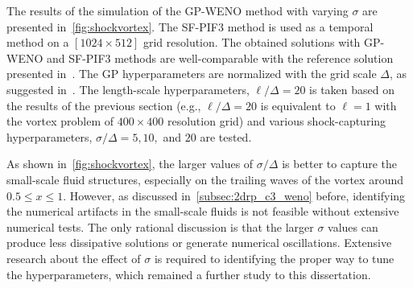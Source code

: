 The results of the simulation of the GP-WENO method with varying \( \sigma \)
are presented in~\cref{fig:shockvortex}.
The SF-PIF3 method is used as a temporal method on a \( [1024 \times 512] \) grid resolution.
The obtained solutions with GP-WENO and SF-PIF3 methods are
well-comparable with the reference solution presented in~\cite{cheng2019two,galbraith5th}.
The GP hyperparameters are normalized with the grid scale \( \Delta \),
as suggested in~\cite{reyes2018new,reyes2019variable}.
The length-scale hyperparameters, \( \ell/\Delta = 20 \) is taken
based on the results of the previous section
(e.g., \( \ell/\Delta = 20 \) is equivalent to \( \ell = 1 \) with the vortex problem of \( 400 \times 400 \) resolution grid)
and various shock-capturing hyperparameters, \( \sigma/\Delta = 5, 10, \) and \( 20 \) are tested.

As shown in~\cref{fig:shockvortex}, the larger values of \( \sigma/\Delta \) is better
to capture the small-scale fluid structures, especially on the trailing waves of the vortex
around \( 0.5 \le x \le 1 \).
However, as discussed in~\cref{subsec:2drp_c3_weno} before,
identifying the numerical artifacts in the small-scale fluids is not feasible
without extensive numerical tests.
The only rational discussion is that the larger \( \sigma \) values
can produce less dissipative solutions
or generate numerical oscillations.
Extensive research about the effect of \( \sigma \) is required
to identifying the proper way to tune the hyperparameters,
which remained a further study to this dissertation.
